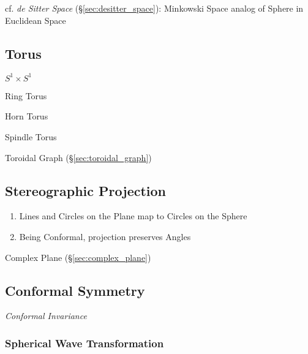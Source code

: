 \begin{itemize}
cf. \emph{de Sitter Space} (\S\ref{sec:desitter_space}): Minkowski Space analog
of Sphere in Euclidean Space



\subsection{Torus}\label{sec:torus}

$S^1 \times S^1$

Ring Torus

Horn Torus

Spindle Torus

\fist Toroidal Graph (\S\ref{sec:toroidal_graph})



\subsection{Stereographic Projection}\label{sec:stereographic_projection}

\begin{enumerate}
  \item Lines and Circles on the Plane map to Circles on the Sphere
  \item Being Conformal, projection preserves Angles
\end{enumerate}

Complex Plane (\S\ref{sec:complex_plane})



\subsection{Conformal Symmetry}\label{sec:conformal_symmetry}

\emph{Conformal Invariance}



\subsubsection{Spherical Wave Transformation}
\label{sec:spherical_wave_transformation}


\end{itemize}
